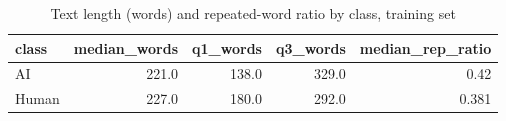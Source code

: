 \begin{table}[!t]
\centering
\caption{Text length (words) and repeated-word ratio by class, training set}
\label{tab:length_by_class}
\footnotesize
\begin{tabular}{lrrrr}
\toprule
\textbf{class} & \textbf{median\_words} & \textbf{q1\_words} & \textbf{q3\_words} & \textbf{median\_rep\_ratio} \\
\midrule
AI & 221.0 & 138.0 & 329.0 & 0.42 \\
Human & 227.0 & 180.0 & 292.0 & 0.381 \\
\bottomrule
\end{tabular}
\end{table}
